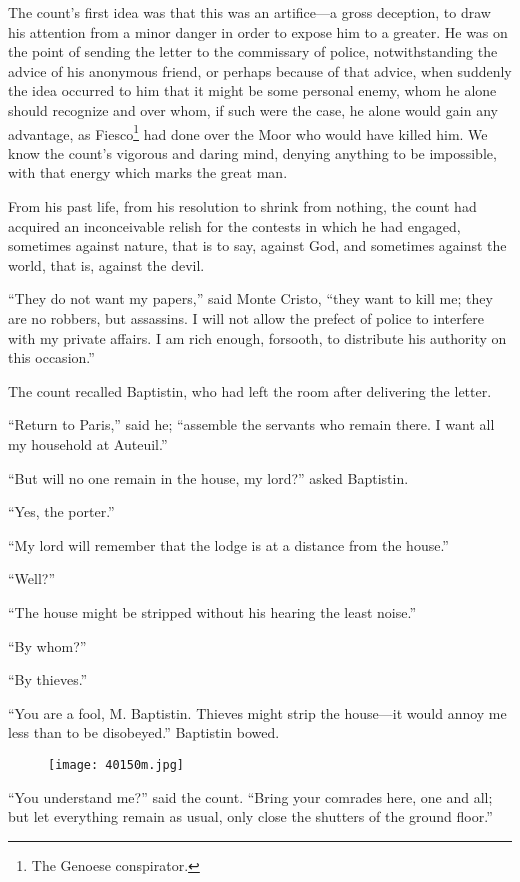 The count’s first idea was that this was an artifice—a gross deception,
to draw his attention from a minor danger in order to expose him to a
greater. He was on the point of sending the letter to the commissary of
police, notwithstanding the advice of his anonymous friend, or perhaps
because of that advice, when suddenly the idea occurred to him that it
might be some personal enemy, whom he alone should recognize and over
whom, if such were the case, he alone would gain any advantage, as
Fiesco\footnote[17]{The Genoese conspirator.} had done over the Moor
who would have killed him. We know the count’s vigorous and daring
mind, denying anything to be impossible, with that energy which marks
the great man.

From his past life, from his resolution to shrink from nothing, the
count had acquired an inconceivable relish for the contests in which he
had engaged, sometimes against nature, that is to say, against God, and
sometimes against the world, that is, against the devil.

“They do not want my papers,” said Monte Cristo, “they want to kill me;
they are no robbers, but assassins. I will not allow the prefect of
police to interfere with my private affairs. I am rich enough,
forsooth, to distribute his authority on this occasion.”

The count recalled Baptistin, who had left the room after delivering
the letter.

“Return to Paris,” said he; “assemble the servants who remain there. I
want all my household at Auteuil.”

“But will no one remain in the house, my lord?” asked Baptistin.

“Yes, the porter.”

“My lord will remember that the lodge is at a distance from the house.”

“Well?”

“The house might be stripped without his hearing the least noise.”

“By whom?”

“By thieves.”

“You are a fool, M. Baptistin. Thieves might strip the house—it would
annoy me less than to be disobeyed.” Baptistin bowed.

\begin{figure}[ht]
\texttt{[image: 40150m.jpg]}
\end{figure}

“You understand me?” said the count. “Bring your comrades here, one and
all; but let everything remain as usual, only close the shutters of the
ground floor.”


